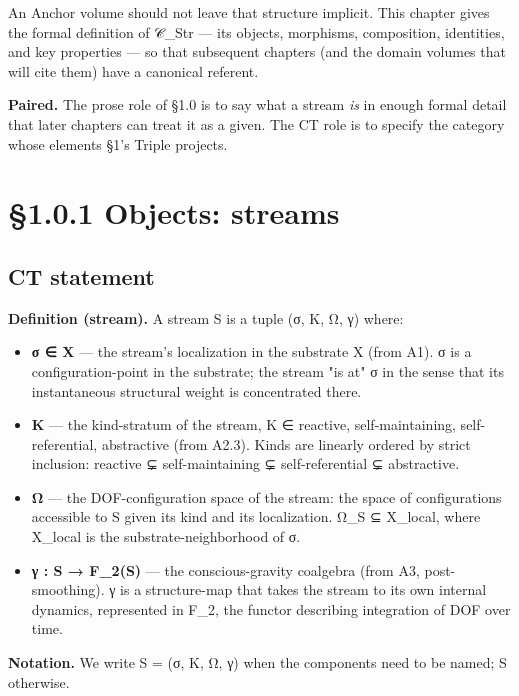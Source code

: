 \documentclass[11pt, openany]{book}
\newcommand{\sectionbreak}{\clearpage}
\begin{document}
An Anchor volume should not leave that structure implicit. This chapter gives the formal definition of 𝒞\_\allowbreak{}Str --- its objects, morphisms, composition, identities, and key properties --- so that subsequent chapters (and the domain volumes that will cite them) have a canonical referent.

\textbf{Paired.} The prose role of §1.0 is to say what a stream \textit{is} in enough formal detail that later chapters can treat it as a given. The CT role is to specify the category whose elements §1's Triple projects.

\sectionbreak

\section{§1.0.1 Objects: streams}

\subsection{CT statement}

\textbf{Definition (stream).} A stream S is a tuple (σ, K, Ω, γ) where:

\begin{itemize}
\item \textbf{σ ∈ X} --- the stream's localization in the substrate X (from A1). σ is a configuration-point in the substrate; the stream "is at" σ in the sense that its instantaneous structural weight is concentrated there.
\item \textbf{K} --- the kind-stratum of the stream, K ∈ {reactive, self-maintaining, self-referential, abstractive} (from A2.3). Kinds are linearly ordered by strict inclusion: reactive ⊊ self-maintaining ⊊ self-referential ⊊ abstractive.
\item \textbf{Ω} --- the DOF-configuration space of the stream: the space of configurations accessible to S given its kind and its localization. Ω\_\allowbreak{}S ⊆ X\_\allowbreak{}local, where X\_\allowbreak{}local is the substrate-neighborhood of σ.
\item \textbf{γ : S → F\_\allowbreak{}2(S)} --- the conscious-gravity coalgebra (from A3, post-smoothing). γ is a structure-map that takes the stream to its own internal dynamics, represented in F\_\allowbreak{}2, the functor describing integration of DOF over time.
\end{itemize}

\textbf{Notation.} We write S = (σ, K, Ω, γ) when the components need to be named; S otherwise.
\end{document}
